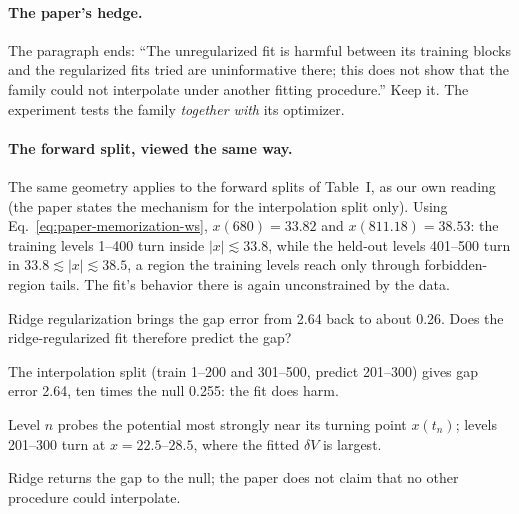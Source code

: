 \paragraph{The paper's hedge.} The paragraph ends: ``The unregularized fit is harmful between its training blocks and the regularized fits tried are uninformative there; this does not show that the family could not interpolate under another fitting procedure.'' Keep it. The experiment tests the family \emph{together with} its optimizer.

\paragraph{The forward split, viewed the same way.} The same geometry applies to the forward splits of Table~I, as our own reading (the paper states the mechanism for the interpolation split only). Using Eq.~\eqref{eq:paper-memorization-ws}, $x(680)=33.82$ and $x(811.18)=38.53$: the training levels 1--400 turn inside $|x|\lesssim33.8$, while the held-out levels 401--500 turn in $33.8\lesssim|x|\lesssim38.5$, a region the training levels reach only through forbidden-region tails. The fit's behavior there is again unconstrained by the data.

\begin{checkpoint}
Ridge regularization brings the gap error from 2.64 back to about 0.26. Does the ridge-regularized fit therefore predict the gap?
\end{checkpoint}

\begin{keyideas}
\item The interpolation split (train 1--200 and 301--500, predict 201--300) gives gap error 2.64, ten times the null 0.255: the fit does harm.
\item Level $n$ probes the potential most strongly near its turning point $x(t_n)$; levels 201--300 turn at $x=22.5$--$28.5$, where the fitted $\delta V$ is largest.
\item Ridge returns the gap to the null; the paper does not claim that no other procedure could interpolate.
\end{keyideas}

